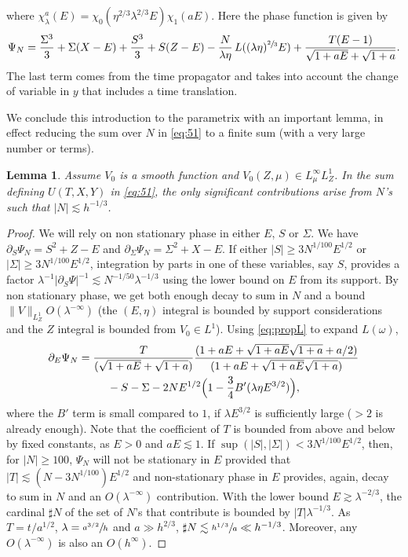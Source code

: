 \documentclass[JEP,XML,SOM,Unicode,NoEqCountersInSection,NoFloatCountersInSection,published]{cedram}
\theoremstyle{plain}
\newtheorem{lemma}{Lemma}
\theoremstyle{definition}
\begin{document}
where $\chi_{\lambda}^{a}(E)=\chi_{0}(\eta^{2/3} \lambda^{2/3} E)\chi_{1}(a E)$. Here the phase function is given by
\begin{equation*}
\label{eq:52}
\Psi_{N}=\frac{\Sigma^{3}}3 +\Sigma(X-E)+\frac {S^{3}} 3+S({Z}-E)-\frac N{\lambda \eta}\, L((\lambda \eta)^{\sfrac 2 3} E)+\frac { T(E-1)}{\sqrt {1+a E}+\sqrt{1+a}}.
\end{equation*}
The last term comes from the time propagator and takes into account the change of variable in $y$ that includes a time translation.

We conclude this introduction to the parametrix with an important lemma, in effect reducing the sum over $N$ in \eqref{eq:51} to a finite sum (with a very large number or terms).
\begin{lemma}\label{sumNfinie}
Assume $V_{0}$ is a smooth function and $V_{0}(Z,\mu)\in L^{\infty}_{\mu}L^{1}_{Z}$. In the sum defining $U(T,X,Y)$ in \eqref{eq:51}, the only significant contributions arise from $N$'s such that $|N|\lesssim h^{-1/3}$.
\end{lemma}
\begin{proof}
We will rely on non stationary phase in either $E$, $S$ or $\Sigma$. We have $\partial_{S}\Psi_{N}=S^{2}+Z-E$ and $\partial_{\Sigma}\Psi_{N}=\Sigma^{2}+X-E$. If either $|S|\geq 3 N^{1/100} E^{1/2} $ or $|\Sigma|\geq 3 N^{1/100}E^{1/2}$, integration by parts in one of these variables, say $S$, provides a factor $\lambda^{-1}|\partial_{S} \Psi|^{-1}\lesssim N^{-1/50}\lambda^{-1/3}$ using the lower bound on $E$ from its support. By non stationary phase, we get both enough decay to sum in $N$ and a bound $\|V\|_{L^{1}_{Z}} O(\lambda^{-\infty})$ (the $(E,\eta)$ integral is bounded by support considerations and the $Z$ integral is bounded from $V_{0}\in L^{1}$). Using \eqref{eq:propL} to expand $L(\omega)$,
\begin{multline*}
\partial_{E}\Psi_{N}=\frac T {(\sqrt{1+aE}+\sqrt{1+a})}\frac{(1+aE+\sqrt{1+aE}\sqrt{1+a} +a/2)}{(1+aE +\sqrt{1+aE}\sqrt{1+a})} \\
{}-S -\Sigma-2NE^{1/2}\Bigl(1-\frac 3 4 B'(\lambda \eta E^{3/2}) \Bigr),
\end{multline*}
where the $B'$ term is small compared to $1$, if $\lambda E^{3/2}$ is sufficiently large ($>2$ is already enough). Note that the coefficient of $T$ is bounded from above and below by fixed constants, as $E>0$ and $aE\lesssim 1$.
If $\sup(|S|,|\Sigma|)<3 N^{1/100}E^{1/2}$, then, for $|N|\geq 100$, $\Psi_{N}$ will not be stationary in $E$ provided that $|T|\lesssim (N-3N^{1/100}) E^{1/2} $ and non-stationary phase in $E$ provides, again, decay to sum in $N$ and an $O(\lambda^{-\infty})$ contribution. With the lower bound $E\gtrsim \lambda^{-2/3}$, the cardinal $\sharp N$ of the set of $N$'s that contribute is bounded by $|T| \lambda^{-1/3}$. As $T=t/a^{1/2}$, $\lambda=\sfrac{a^{3/2}}{h}$ and $a\gg h^{2/3}$, $\sharp N\lesssim \sfrac{h^{1/3}}{a}\ll h^{-1/3}$. Moreover, any $O(\lambda^{-\infty})$ is also an $O(h^{\infty})$. \end{proof}
\end{document}
